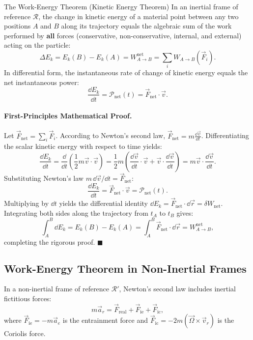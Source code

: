 \begin{lawbox}{The Work-Energy Theorem (Kinetic Energy Theorem)}
In an inertial frame of reference $\mathcal{R}$, the change in kinetic energy of a material point between any two positions $A$ and $B$ along its trajectory equals the algebraic sum of the work performed by \textbf{all} forces (conservative, non-conservative, internal, and external) acting on the particle:
\begin{equation}
\Delta E_k = E_k(B) - E_k(A) = W_{A \to B}^{\text{net}} = \sum_i W_{A \to B}(\vec{F}_i).
\end{equation}
In differential form, the instantaneous rate of change of kinetic energy equals the net instantaneous power:
\begin{equation}
\frac{\dd E_k}{\dd t} = \mathcal{P}_{\text{net}}(t) = \vec{F}_{\text{net}} \cdot \vec{v}.
\end{equation}
\end{lawbox}

\paragraph{First-Principles Mathematical Proof.}
Let $\vec{F}_{\text{net}} = \sum_i \vec{F}_i$. According to Newton's second law, $\vec{F}_{\text{net}} = m \frac{\dd\vec{v}}{\dd t}$. Differentiating the scalar kinetic energy with respect to time yields:
\[
\frac{\dd E_k}{\dd t} = \frac{\dd}{\dd t}\left(\frac{1}{2} m \vec{v}\cdot\vec{v}\right) = \frac{1}{2}m\left( \frac{\dd\vec{v}}{\dd t}\cdot\vec{v} + \vec{v}\cdot\frac{\dd\vec{v}}{\dd t} \right) = m \vec{v}\cdot\frac{\dd\vec{v}}{\dd t}.
\]
Substituting Newton's law $m\,\dd\vec{v}/\dd t = \vec{F}_{\text{net}}$:
\[
\frac{\dd E_k}{\dd t} = \vec{F}_{\text{net}} \cdot \vec{v} = \mathcal{P}_{\text{net}}(t).
\]
Multiplying by $\dd t$ yields the differential identity $\dd E_k = \vec{F}_{\text{net}}\cdot\dd\vec{r} = \delta W_{\text{net}}$. Integrating both sides along the trajectory from $t_A$ to $t_B$ gives:
\[
\int_{A}^B \dd E_k = E_k(B) - E_k(A) = \int_{A}^B \vec{F}_{\text{net}} \cdot \dd\vec{r} = W_{A \to B}^{\text{net}},
\]
completing the rigorous proof. $\blacksquare$

\subsection{Work-Energy Theorem in Non-Inertial Frames}

In a non-inertial frame of reference $\mathcal{R}'$, Newton's second law includes inertial fictitious forces:
\[
m\vec{a}_r = \vec{F}_{\text{real}} + \vec{F}_{\text{ie}} + \vec{F}_{\text{ic}},
\]
where $\vec{F}_{\text{ie}} = -m\vec{a}_e$ is the entrainment force and $\vec{F}_{\text{ic}} = -2m(\vec{\Omega}\times\vec{v}_r)$ is the Coriolis force.

